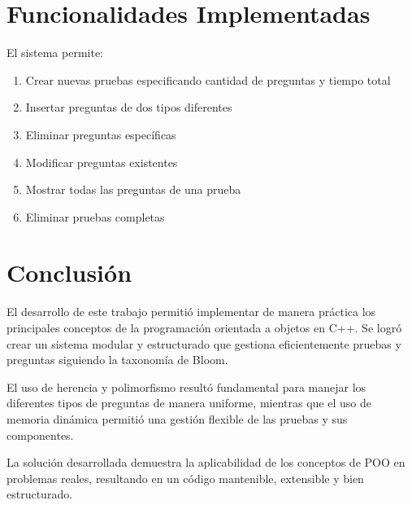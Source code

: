 \documentclass[12pt]{article}
\begin{document}
\section{Funcionalidades Implementadas}
El sistema permite:
\begin{enumerate}
    \item Crear nuevas pruebas especificando cantidad de preguntas y tiempo total
    \item Insertar preguntas de dos tipos diferentes
    \item Eliminar preguntas espec\'ificas
    \item Modificar preguntas existentes
    \item Mostrar todas las preguntas de una prueba
    \item Eliminar pruebas completas
\end{enumerate}

\section{Conclusi\'on}
El desarrollo de este trabajo permiti\'o implementar de manera pr\'actica los principales conceptos de la programaci\'on orientada a objetos en C++. Se logr\'o crear un sistema modular y estructurado que gestiona eficientemente pruebas y preguntas siguiendo la taxonom\'ia de Bloom.

El uso de herencia y polimorfismo result\'o fundamental para manejar los diferentes tipos de preguntas de manera uniforme, mientras que el uso de memoria din\'amica permiti\'o una gesti\'on flexible de las pruebas y sus componentes.

La soluci\'on desarrollada demuestra la aplicabilidad de los conceptos de POO en problemas reales, resultando en un c\'odigo mantenible, extensible y bien estructurado.
\end{document}
